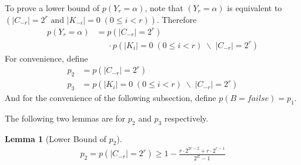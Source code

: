\documentclass[10pt, conference, compsocconf]{IEEEtran}
\newtheorem{mylemma}{Lemma}
\begin{document}
        To prove a lower bound of $p(Y_r = \alpha)$, note that
        $(Y_r = \alpha)$ is equivalent to $\left(|C_{-r}| = 2^r \text{ and } |K_{-i}| = 0   \; (0 \leq i < r)\right)$.
        Therefore
        \begin{align*}
            p(Y_r = \alpha) &= p(|C_{-r}| = 2^r)\\
                & \;\;\;\;\; \cdot p(|K_i| = 0  \; (0 \leq i < r) \; \backslash \; |C_{-r}| = 2^r)
        \end{align*}
        For convenience, define
        \begin{align*}
            p_2 &= p(|C_{-r}| = 2^r)\\
            p_3 &= p(|K_i| = 0  \; (0 \leq i < r) \; \backslash \; |C_{-r}| = 2^r)
        \end{align*}
        And for the convenience of the following subsection, define $p(B = failse) = p_1$.

        The following two lemmas are for $p_2$ and $p_3$
        respectively.

        \begin{mylemma}[Lower Bound of $p_2$]
            \begin{align*}
                p_2 = p(|C_{-r}| = 2^r) \geq 1-\frac{r \cdot 2^{2r-2}+r \cdot 2^{r-1}}{2^E-1}
            \end{align*}
        \end{mylemma}
\end{document}
